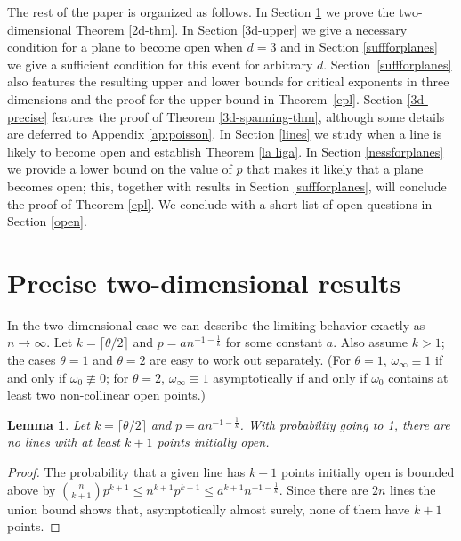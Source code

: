 \documentclass{amsart}
\newcommand{\threshold}{\theta}
\numberwithin{equation}{section}
\newtheorem{lemma}[theorem]{Lemma}
\theoremstyle{definition}
\theoremstyle{remark}
\begin{document}
The rest of the paper is organized as follows. In Section \ref{2d} we 
prove the two-dimensional Theorem \ref{2d-thm}. 
In Section \ref{3d-upper} we give a necessary condition for a plane to become  
open when $d=3$ and in Section \ref{suffforplanes} we give a sufficient condition 
for this event for arbitrary $d$. Section~\ref{suffforplanes} also features the resulting upper
and lower bounds for critical exponents in three dimensions and the proof for the upper bound in Theorem~\ref{epl}.  Section \ref{3d-precise}
features the proof of Theorem \ref{3d-spanning-thm}, although some details are 
deferred to Appendix \ref{ap:poisson}.
In Section \ref{lines} we study when a line is likely to become open
and establish Theorem \ref{la liga}. In Section
\ref{nessforplanes} we provide a lower bound on the value of $p$ that makes
it likely that a plane becomes open; this, together with results in Section \ref{suffforplanes}, 
will conclude the proof of Theorem \ref{epl}.
We conclude with a short list of open questions in Section \ref{open}. 

\section{Precise two-dimensional results}
\label{2d}
In the two-dimensional case we can describe the limiting behavior exactly as $n \to \infty$. Let $k = \lceil \threshold/2\rceil$ and $p = an^{-1-\frac{1}{k}}$ for some constant $a$. Also assume $k > 1$; the cases $\threshold=1$ and $\threshold=2$ are easy to work out separately. (For $\threshold=1$, $\omega_\infty \equiv 1$ if and only if $\omega_0 \not\equiv 0$; for $\threshold=2$, $\omega_\infty \equiv 1$ asymptotically if and only if $\omega_0$ contains at least two non-collinear open points.)

\begin{lemma} \label{overlines}
Let $k = \lceil \threshold/2\rceil$ and $p = an^{-1-\frac{1}{k}}$. With probability going to 1, there are no lines with at least $k+1$ points initially open.
\end{lemma}
\begin{proof}
The probability that a given line has $k+1$ points initially open is bounded
above by ${n \choose {k+1}}p^{k+1} \le n^{k+1}p^{k+1}\le a^{k+1}n^{-1-\frac{1}{k}}$. Since
there are $2n$ lines the union bound shows that, asymptotically almost surely, 
none of them have $k+1$ points.
\end{proof}
\end{document}

